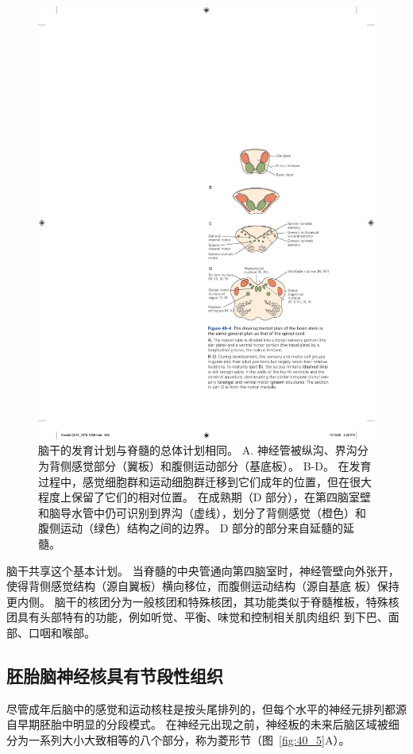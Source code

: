 \begin{figure}[htbp]
	\centering
	\includegraphics[width=0.5\linewidth]{chap40/fig_40_4}
	\caption{脑干的发育计划与脊髓的总体计划相同。 A. 神经管被纵沟、界沟分为背侧感觉部分（翼板）和腹侧运动部分（基底板）。 B-D。 在发育过程中，感觉细胞群和运动细胞群迁移到它们成年的位置，但在很大程度上保留了它们的相对位置。 在成熟期（D 部分），在第四脑室壁和脑导水管中仍可识别到界沟（虚线），划分了背侧感觉（橙色）和腹侧运动（绿色）结构之间的边界。 D 部分的部分来自延髓的延髓。}
	\label{fig:40_4}
\end{figure}


脑干共享这个基本计划。
当脊髓的中央管通向第四脑室时，神经管壁向外张开，使得背侧感觉结构（源自翼板）横向移位，而腹侧运动结构（源自基底 板）保持更内侧。
脑干的核团分为一般核团和特殊核团，其功能类似于脊髓椎板，特殊核团具有头部特有的功能，例如听觉、平衡、味觉和控制相关肌肉组织 到下巴、面部、口咽和喉部。



\subsection{胚胎脑神经核具有节段性组织}

尽管成年后脑中的感觉和运动核柱是按头尾排列的，但每个水平的神经元排列都源自早期胚胎中明显的分段模式。 
在神经元出现之前，神经板的未来后脑区域被细分为一系列大小大致相等的八个部分，称为菱形节（图~\ref{fig:40_5}A）。



